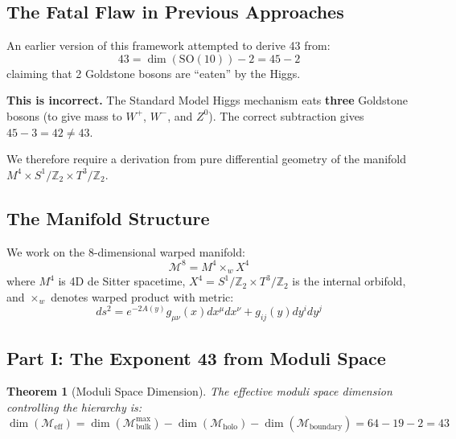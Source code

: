 \documentclass[11pt,a4paper]{article}
\theoremstyle{plain}
\newtheorem{theorem}{Theorem}[section]
\theoremstyle{definition}
\theoremstyle{remark}
\newcommand{\Ztwo}{\mathbb{Z}_2}
\newcommand{\SOten}{\text{SO}(10)}
\begin{document}
\subsection{The Fatal Flaw in Previous Approaches}

An earlier version of this framework attempted to derive 43 from:
\[
43 = \dim(\SOten) - 2 = 45 - 2
\]
claiming that 2 Goldstone bosons are ``eaten'' by the Higgs.

\textbf{This is incorrect.} The Standard Model Higgs mechanism eats \textbf{three} Goldstone bosons (to give mass to $W^+$, $W^-$, and $Z^0$). The correct subtraction gives $45 - 3 = 42 \neq 43$.

We therefore require a derivation from pure differential geometry of the manifold $M^4 \times S^1/\Ztwo \times T^3/\Ztwo$.

\subsection{The Manifold Structure}

We work on the 8-dimensional warped manifold:
\[
\mathcal{M}^8 = M^4 \times_w X^4
\]
where $M^4$ is 4D de Sitter spacetime, $X^4 = S^1/\Ztwo \times T^3/\Ztwo$ is the internal orbifold, and $\times_w$ denotes warped product with metric:
\[
ds^2 = e^{-2A(y)} g_{\mu\nu}(x) dx^\mu dx^\nu + g_{ij}(y) dy^i dy^j
\]

\subsection{Part I: The Exponent 43 from Moduli Space}

\begin{theorem}[Moduli Space Dimension]
The effective moduli space dimension controlling the hierarchy is:
\[
\dim(\mathcal{M}_{\text{eff}}) = \dim(\mathcal{M}_{\text{bulk}}^{\max}) - \dim(\mathcal{M}_{\text{holo}}) - \dim(\mathcal{M}_{\text{boundary}}) = 64 - 19 - 2 = 43
\]
\end{theorem}
\end{document}
